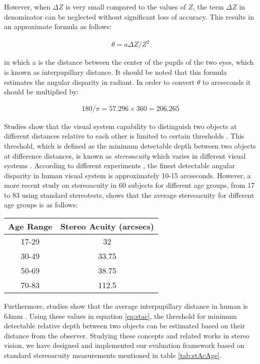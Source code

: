 However, when $\Delta Z$ is very small compared to the values of $Z$, the term $\Delta Z$ in denominator can be neglected without significant loss of accuracy. This results in
an approximate formula as follows:

\begin{align}
\label{eq:stac}
\theta = a \Delta Z/Z^{2}
\end{align}

in which a is the distance between the center of the pupils of the two eyes, which is known as interpupillary distance.
It should be noted that this formula estimates the angular disparity in radiant. In order to convert $\theta$ to arcseconds it should be multiplied by:

\begin{align}
180/\pi = 57.296\times360=206.265
\end{align}

Studies show that the visual system capability to distinguish two objects at different distances relative to each other is limited to certain thresholds \cite{binr83,how95}.
This threshold, which is defined as the minimum detectable depth between two 
objects at difference distances, is known as {\it stereoacuity} which varies in different visual systems \cite{binr83,how95}. According to different
experiments \cite{binr83}, the finest detectable angular disparity in human visual system is approximately 10-15 arcseconds. However, a more recent study on
stereoacuity in 60 subjects \cite{garn06} for different age groups, from 17 to 83 using standard stereotests, 
shows that the average stereoacuity for different age groups is as follows:

\begin{minipage}{\linewidth}
\begin{center}
\label{tab:stAcAge}
\begin{tabular}{ |c|c| }
\hline
\textbf{Age Range} & \textbf{Stereo Acuity (arcsecs)} \\ \hline
17-29 & 32 \\  \hline
30-49 & 33.75 \\ \hline
50-69 & 38.75 \\ \hline
70-83 & 112.5 \\ \hline
\end{tabular}
\end{center}
\end{minipage} \newline \newline

Furthermore, studies show that the average interpupillary distance in human is 64mm \cite{how95}. 
Using these values in equation \ref{eq:stac}, the threshold for minimum detectable relative depth 
between two objects can be estimated based on their distance from the observer. \newline 
Studying these concepts and related works in stereo vision, we have designed and implemented our evaluation framework based on standard
stereoacuity measurements mentioned in table \ref{tab:stAcAge}.
